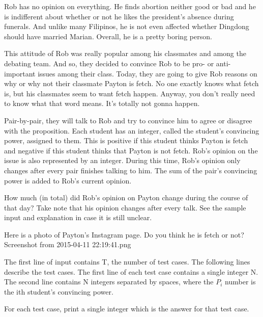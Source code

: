Rob has no opinion on everything. He finds abortion neither good or bad and he is indifferent about whether or not he likes the president's absence during funerals. And unlike many Filipinos, he is not even affected whether Dingdong should have married Marian. Overall, he is a pretty boring person.

This attitude of Rob was really popular among his classmates and among the debating team. And so, they decided to convince Rob to be pro- or anti- important issues among their class. Today, they are going to give Rob reasons on why or why not their classmate Payton is fetch. No one exactly knows what fetch is, but his classmates seem to want fetch happen. Anyway, you don't really need to know what that word means. It's totally not gonna happen.

Pair-by-pair, they will talk to Rob and try to convince him to agree or disagree with the proposition. Each student has an integer, called the student's convincing power, assigned to them. This is positive if this student thinks Payton is fetch and negative if this student thinks that Payton is not fetch. Rob's opinion on the issue is also represented by an integer. During this time, Rob's opinion only changes after every pair finishes talking to him. The sum of the pair's convincing power is added to Rob's current opinion.

How much (in total) did Rob's opinion on Payton change during the course of that day? Take note that his opinion changes after every talk. See the sample input and explanation in case it is still unclear.

Here is a photo of Payton's Instagram page. Do you think he is fetch or not?Screenshot from 2015-04-11 22:19:41.png

The first line of input contains T, the number of test cases. The following lines describe the test cases. The first line of each test case contains a single integer N. The second line contains N integers separated by spaces, where the $P_i$ number is the ith student's convincing power.

For each test case, print a single integer which is the answer for that test case.
